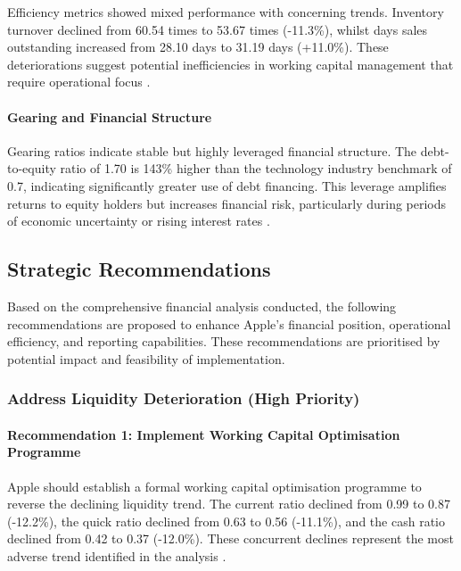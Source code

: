 \documentclass[12pt,a4paper]{article}
\begin{document}
Efficiency metrics showed mixed performance with concerning trends. Inventory turnover declined from 60.54 times to 53.67 times (-11.3\%), whilst days sales outstanding increased from 28.10 days to 31.19 days (+11.0\%). These deteriorations suggest potential inefficiencies in working capital management that require operational focus \citep{kieso2023}.

\paragraph{Gearing and Financial Structure}

Gearing ratios indicate stable but highly leveraged financial structure. The debt-to-equity ratio of 1.70 is 143\% higher than the technology industry benchmark of 0.7, indicating significantly greater use of debt financing. This leverage amplifies returns to equity holders but increases financial risk, particularly during periods of economic uncertainty or rising interest rates \citep{readyratios2024}.

\subsection{Strategic Recommendations}

Based on the comprehensive financial analysis conducted, the following recommendations are proposed to enhance Apple's financial position, operational efficiency, and reporting capabilities. These recommendations are prioritised by potential impact and feasibility of implementation.

\subsubsection{Address Liquidity Deterioration (High Priority)}

\paragraph{Recommendation 1: Implement Working Capital Optimisation Programme}

Apple should establish a formal working capital optimisation programme to reverse the declining liquidity trend. The current ratio declined from 0.99 to 0.87 (-12.2\%), the quick ratio declined from 0.63 to 0.56 (-11.1\%), and the cash ratio declined from 0.42 to 0.37 (-12.0\%). These concurrent declines represent the most adverse trend identified in the analysis \citep{apple202410k}.
\end{document}
